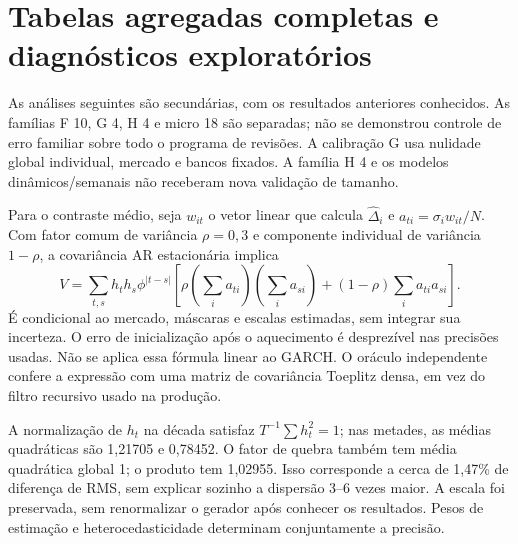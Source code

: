 \documentclass[12 pt]{article}
\begin{document}
\section{Tabelas agregadas completas e diagnósticos exploratórios}
As análises seguintes são secundárias, com os resultados anteriores conhecidos.
As famílias F 10, G 4, H 4 e micro 18 são separadas; não se demonstrou controle
de erro familiar sobre todo o programa de revisões. A calibração G usa
nulidade global individual, mercado e bancos fixados. A família H 4 e
os modelos dinâmicos/semanais não receberam nova validação de tamanho.
\begin{table}[htbp]\centering\small
\caption{Dez alvos agregados originais, bloco 21. Holm 30 permanece sensibilidade
conservadora entre escolhas; não representa 30 hipóteses científicas distintas.
ICs básicos nominais sujeitos à subcobertura descrita no artigo.}

\end{table}
\begin{table}[htbp]\centering\small
\caption{Quatro alvos temporais originais, bloco 21. A mediana de diferenças
pareadas não é a diferença de medianas.}

\end{table}
\begin{table}[htbp]\centering\small
\caption{Média e mediana da década nos modelos alternativos; Holm 18 abrange
os três painéis. A quantidade semanal de pares é 518--520 na década
e 258--259 nos painéis recentes.}

\end{table}

Para o contraste médio, seja $w_{it}$ o vetor linear que calcula
$\widehat\Delta_i $ e $a_{ti}=\sigma_iw_{it}/N $. Com fator comum
de variância $\rho=0,3$ e componente individual de variância $1-\rho $,
a covariância AR estacionária implica
\begin{equation}
 V=\sum_{t,s}h_th_s\phi^{|t-s|}
 \left[\rho\left(\sum_i a_{ti}\right)\left(\sum_i a_{si}\right)
 +(1-\rho)\sum_i a_{ti}a_{si}\right].
\end{equation}
É condicional ao mercado, máscaras e escalas estimadas, sem integrar
sua incerteza. O erro de inicialização após o aquecimento é desprezível
nas precisões usadas. Não se aplica essa fórmula linear ao GARCH.
O oráculo independente confere a expressão com uma matriz de covariância
Toeplitz densa, em vez do filtro recursivo usado na produção.

A normalização de $h_t $ na década satisfaz $T^{-1}\sum h_t^2=1$;
nas metades, as médias quadráticas são 1,21705 e 0,78452. O fator
de quebra também tem média quadrática global 1; o produto tem 1,02955.
Isso corresponde a cerca de 1,47\% de diferença de RMS, sem explicar
sozinho a dispersão 3--6 vezes maior. A escala foi preservada, sem
renormalizar o gerador após conhecer os resultados. Pesos de estimação
e heterocedasticidade determinam conjuntamente a precisão.
\end{document}
